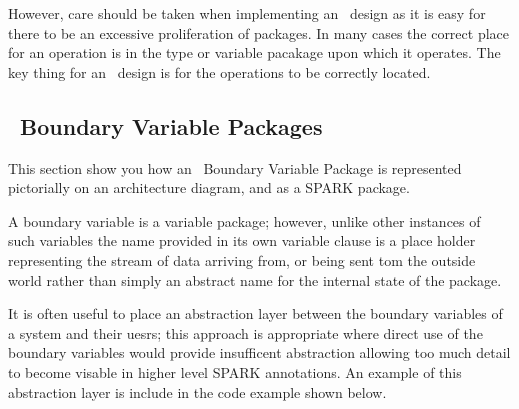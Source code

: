 However, care should be taken when implementing an \informed\ design as it is easy for there to be
an excessive proliferation of packages. In many cases the correct place for an operation is in the
type or variable pacakage upon which it operates. The key thing for an \informed\ design is for the
operations to be correctly located.

\subsection{\informed\ Boundary Variable Packages}
\noindent\parbox[][][t]{.2\linewidth}{
    }%
 \parbox[][][t]{.8\linewidth}{

This section show you how an \informed\ Boundary Variable Package is represented pictorially on an architecture
diagram, and as a SPARK package.
}
A boundary variable is a variable package; however, unlike other instances of such variables the name
provided in its own variable clause is a place holder representing the stream of data arriving from,
or being sent tom the outside world rather than simply an abstract name for the internal state of the
package.

It is often useful to place an abstraction layer between the boundary variables of a system and their uesrs;
this approach is appropriate where direct use of the boundary variables would provide insufficent abstraction
allowing too much detail to become visable in higher level SPARK annotations. An example of this abstraction
layer is include in the code example shown below.

